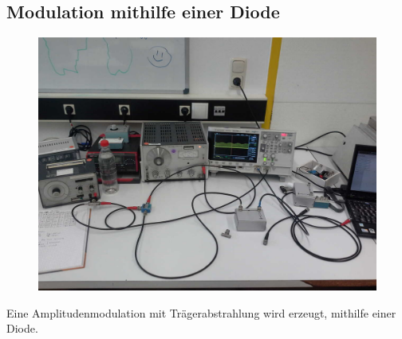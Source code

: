 \subsection{Modulation mithilfe einer Diode}
\begin{figure}
	\centering
	\includegraphics[width = \textwidth]{../Grafiken/Versuchsaufbau_c_AmpModuliertTraeger.jpg}
\end{figure}
Eine Amplitudenmodulation mit Trägerabstrahlung wird erzeugt, mithilfe einer Diode.